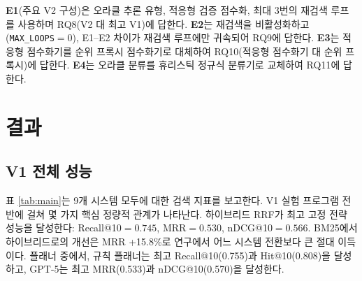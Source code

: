 \documentclass[11pt, a4paper]{article}
\begin{document}
\textbf{E1}(주요 V2 구성)은 오라클 추론 유형, 적응형 검증 점수화, 최대 3번의 재검색 루프를 사용하며 RQ8(V2 대 최고 V1)에 답한다. \textbf{E2}는 재검색을 비활성화하고(\texttt{MAX\_LOOPS}$=0$), E1--E2 차이가 재검색 루프에만 귀속되어 RQ9에 답한다. \textbf{E3}는 적응형 점수화기를 순위 프록시 점수화기로 대체하여 RQ10(적응형 점수화기 대 순위 프록시)에 답한다. \textbf{E4}는 오라클 분류를 휴리스틱 정규식 분류기로 교체하여 RQ11에 답한다.

\section{결과}
\label{sec:results}

\subsection{V1 전체 성능}

표 \ref{tab:main}는 9개 시스템 모두에 대한 검색 지표를 보고한다. V1 실험 프로그램 전반에 걸쳐 몇 가지 핵심 정량적 관계가 나타난다. 하이브리드 RRF가 최고 고정 전략 성능을 달성한다: Recall@10$={0.745}$, MRR$={0.530}$, nDCG@10$={0.566}$. BM25에서 하이브리드로의 개선은 MRR +15.8\%로 연구에서 어느 시스템 전환보다 큰 절대 이득이다. 플래너 중에서, 규칙 플래너는 최고 Recall@10(0.755)과 Hit@10(0.808)을 달성하고, GPT-5는 최고 MRR(0.533)과 nDCG@10(0.570)을 달성한다.
\end{document}
